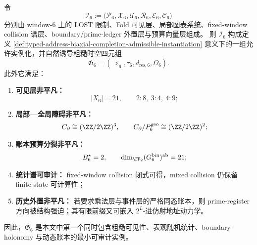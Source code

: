 \begin{proposition}\label{prop:typed-address-biaxial-completion-window6-auditable-example}
令
\[
\mathcal I_6
:=
\bigl(
\mathcal P_6,
\mathcal X_6,
\mathcal U_6,
\mathcal R_6,
\mathcal E_6,
\mathcal C_6
\bigr)
\]
分别由 window-\(6\) 上的 LOST 限制、Fold 可见层、局部图表系统、fixed-window collision 谱层、boundary/prime-ledger 外置层与预算向量层组成。
则 \(\mathcal I_6\) 构成定义 \ref{def:typed-address-biaxial-completion-admissible-instantiation} 意义下的一组允许实例化，并自然诱导粗糙时空四元组
\[
\mathfrak G_6=
(\preceq_6,\tau_6,d_{\mathrm{res},6},\Omega_6).
\]
此外它满足：
\begin{enumerate}
  \item \textbf{可见层非平凡：}
  \[
  |X_6|=21,
  \qquad
  2:8,\ 3:4,\ 4:9;
  \]
  \item \textbf{局部—全局障碍非平凡：}
  \[
  C_{\partial}\cong (\ZZ/2\ZZ)^3,
  \qquad
  C_{\partial}/P_6^{\mathrm{geo}}\cong (\ZZ/2\ZZ)^2;
  \]
  \item \textbf{账本预算分裂非平凡：}
  \[
  B_6^\star=2,
  \qquad
  \dim_{\FF_2}(G_6^{\mathrm{bin}})^{\mathrm{ab}}=21;
  \]
  \item \textbf{统计谱可审计：}
  fixed-window collision 闭式可得，mixed collision 仍保留 finite-state 可计算性；
  \item \textbf{历史外置非平凡：}
  若要求乘法层与事件层的严格同态账本，则 prime-register 方向被结构强迫；其有限前缀又可嵌入 \(2^L\)-进仿射地址动力学。
\end{enumerate}
因此，\(\mathfrak G_6\) 是本文中第一个同时包含粗糙可见性、表观随机统计、boundary holonomy 与动态账本的最小可审计实例。
\end{proposition}

